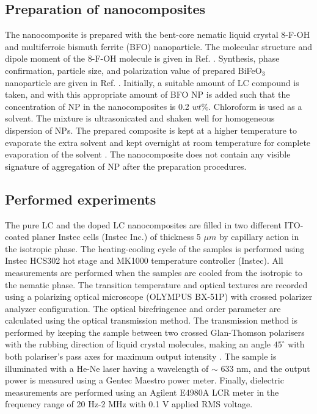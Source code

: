 \documentclass[reprint,amsfonts,amsmath,amssymb,aps,pre,floatfix,10pt]{revtex4-1}
\begin{document}
\subsection{Preparation of nanocomposites}
The nanocomposite is prepared with the bent-core nematic liquid crystal 8-F-OH and multiferroic bismuth ferrite (BFO) nanoparticle. The molecular structure and dipole moment of the 8-F-OH molecule is given in Ref. \cite{zhang2022electric_27}. Synthesis, phase confirmation, particle size, and polarization value of prepared BiFeO$_3$ nanoparticle are given in Ref. \cite{Dhananjoy2023dielectric_21}.  Initially, a suitable amount of LC compound is taken, and with this appropriate amount of BFO NP is added such that the concentration of NP in the nanocomposites is 0.2 $wt\%$. Chloroform is used as a solvent. The mixture is ultrasonicated and shaken well for homogeneous dispersion of NPs. The prepared composite is kept at a higher temperature to evaporate the extra solvent and kept overnight at room temperature for complete evaporation of the solvent \cite{kumar2018nanodoping_12}. The nanocomposite does not contain any visible signature of aggregation of NP after the preparation procedures.

\subsection{Performed experiments}

The pure LC and the doped LC nanocomposites are filled in two different ITO-coated planer Instec cells (Instec Inc.) of thickness 5 $\mu m$ by capillary action in the isotropic phase. The heating-cooling cycle of the samples is performed using Instec HCS302 hot stage and MK1000 temperature controller (Instec). All measurements are performed when the samples are cooled from the isotropic to the nematic phase. The transition temperature and optical textures are recorded using a polarizing optical microscope (OLYMPUS BX-51P) with crossed polarizer analyzer configuration. The optical birefringence and order parameter are calculated using the optical transmission method. The transmission method is performed by keeping the sample between two crossed Glan-Thomson polarisers with the rubbing direction of liquid crystal molecules, making an angle $45^\circ$ with both polariser's pass axes for maximum output intensity \cite{chakraborty2015effect_39}. The sample is illuminated with a He-Ne laser having a wavelength of $\sim$ 633 $\mathrm{nm}$, and the output power is measured using a Gentec Maestro power meter. Finally, dielectric measurements are performed using an Agilent E4980A LCR meter in the frequency range of 20 Hz-2 MHz with 0.1 V applied RMS voltage.
\end{document}
